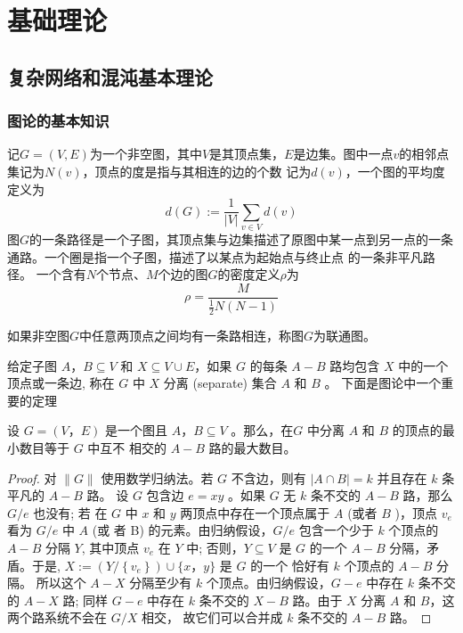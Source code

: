 \chapter{基础理论}
\section{复杂网络和混沌基本理论}
\subsection{图论的基本知识}
记$G=(V,E)$为一个非空图，其中$V$是其顶点集，$E$是边集。图中一点$v$的相邻点集记为$N(v)$，顶点的度是指与其相连的边的个数
记为$d(v)$，一个图的平均度定义为
\begin{equation}
    d(G):=\frac{1}{|V|} \sum_{v \in V} d(v)
\end{equation}
图$G$的一条路径是一个子图，其顶点集与边集描述了原图中某一点到另一点的一条通路。一个圈是指一个子图，描述了以某点为起始点与终止点
的一条非平凡路径。
一个含有$N$个节点、$M$个边的图$G$的密度定义$\rho$为
\begin{equation}
    \rho=\frac{M}{\frac{1}{2} N(N-1)}
\end{equation}
\begin{definition}
    如果非空图$G$中任意两顶点之间均有一条路相连，称图$G$为联通图。
\end{definition}
给定子图 $A，B \subseteq V$ 和 $X \subseteq V \cup E$，如果 $G$ 的每条 $A-B$ 路均包含 $X$ 中的一个顶点或一条边,
称在 $G$ 中 $X$ 分离 (separate) 集合 $A$ 和 $B$ 。
下面是图论中一个重要的定理
\begin{theorem}
    设 $G=(V，E)$ 是一个图且 $A，B \subseteq V$ 。那么，在$G$ 中分离 $A$ 和 $B$ 的顶点的最小数目等于 $G$ 中互不
    相交的 $A-B$ 路的最大数目。
\end{theorem}
\begin{proof}
    对 $\|G\|$ 使用数学归纳法。若 $G$ 不含边，则有 $|A \cap B|=k$ 并且存在 $k$ 条平凡的 $A-B$ 路。 
    设 $G$ 包含边 $e=x y$ 。如果 $G$ 无 $k$ 条不交的 $A-B$ 路，那么 $G / e$ 也没有; 
    若 在 $G$ 中 $x$ 和 $y$ 两顶点中存在一个顶点属于 $A$ (或者 $B$ )，顶点 $v_e$ 
    看为 $G / e$ 中 $A$ (或 者 B) 的元素。由归纳假设，$G / e$ 包含一个少于 $k$ 个顶点的 $A-B$ 分隔 $Y$,
     其中顶点 $v_e$ 在 $Y$ 中; 否则，$Y \subseteq V$ 是 $G$ 的一个 $A-B$ 分隔，矛盾。于是,
     $X:=\left(Y /\left\{v_e\right\}\right) \cup\{x，y\}$ 是 $G$ 的一个 恰好有 $k$ 个顶点的 $A-B$ 分隔。
      所以这个 $A-X$ 分隔至少有 $k$ 个顶点。由归纳假设，$G-e$ 中存在 $k$ 条不交的 $A-X$ 路; 
      同样 $G-e$ 中存在 $k$ 条不交的 $X-B$ 路。由于 $X$ 分离 $A$ 和 $B$，这两个路系统不会在 $G/ X$ 相交，
      故它们可以合并成 $k$ 条不交的 $A-B$ 路。
\end{proof}
